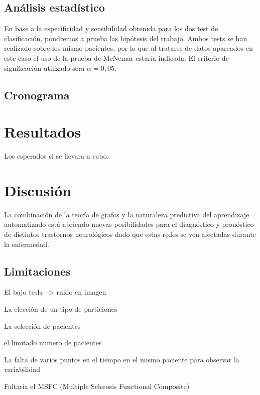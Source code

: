 \documentclass[fleqn,12pt]{UICArticle} %
\begin{document}
\subsection{Análisis estadístico}
En base a la especificidad y sensibilidad obtenida para los dos test de clasificación, pondremos a prueba las hipótesis del trabajo. Ambos tests se han realizado sobre los mismo pacientes, por lo que al tratarse de datos apareados en este caso el uso de la prueba de McNemar estaría indicada. El criterio de significación utilizado será $\alpha = 0,05$.


\subsection{Cronograma}

\section{Resultados}
Los esperados si se llevara a cabo.

\section{Discusión}

La combinación de la teoría de grafos y la naturaleza predictiva del aprendizaje automatizado está abriendo nuevas posibilidades para el diagnóstico y pronóstico de distintos trastornos neurológicos dado que estas redes se ven afectadas durante la enfermedad. 


\subsection{Limitaciones}

\begin{list}{-}
\item El bajo tesla --> ruido en imagen
\item La elección de un tipo de particiones
\item La selección de pacientes
\item el limitado numero de pacientes
\item La falta de varios puntos en el tiempo en el mismo paciente para observar la variabilidad
\item Faltaría el MSFC (Multiple Sclerosis Functional Composite)
\end{list}
\end{document}
